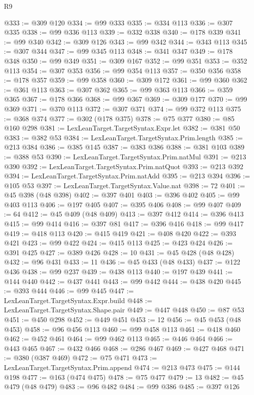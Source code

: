 \begin{lexlean}{R9}
\begin{coremodule}
@333 := @309 @120
@334 := @99 @333
@335 := @334 @113
@336 := @307 @335
@338 := @99 @336 @113
@339 := @332 @338
@340 := @178 @339
@341 := @99 @340
@342 := @309 @126
@343 := @99 @342
@344 := @343 @113
@345 := @307 @344
@347 := @99 @345 @113
@348 := @341 @347
@349 := @178 @348
@350 := @99 @349
@351 := @309 @167
@352 := @99 @351
@353 := @352 @113
@354 := @307 @353
@356 := @99 @354 @113
@357 := @350 @356
@358 := @178 @357
@359 := @99 @358
@360 := @309 @172
@361 := @99 @360
@362 := @361 @113
@363 := @307 @362
@365 := @99 @363 @113
@366 := @359 @365
@367 := @178 @366
@368 := @99 @367
@369 := @309 @177
@370 := @99 @369
@371 := @370 @113
@372 := @307 @371
@374 := @99 @372 @113
@375 := @368 @374
@377 := @302 (@178 @375)
@378 := @75 @377
@380 := @85 @160 @298
@381 := LexLeanTarget.TargetSyntax.Expr.let
@382 := @381 @50
@383 := @382 @53
@384 := LexLeanTarget.TargetSyntax.Prim.length
@385 := @213 @384
@386 := @385 @145
@387 := @383 @386
@388 := @381 @103
@389 := @388 @53
@390 := LexLeanTarget.TargetSyntax.Prim.natMul
@391 := @213 @390
@392 := LexLeanTarget.TargetSyntax.Prim.natQuot
@393 := @213 @392
@394 := LexLeanTarget.TargetSyntax.Prim.natAdd
@395 := @213 @394
@396 := @105 @53
@397 := LexLeanTarget.TargetSyntax.Value.nat
@398 := 72
@401 := @45 @398 (@48 @398)
@402 := @397 @401
@403 := @396 @402
@405 := @99 @403 @113
@406 := @197 @405
@407 := @395 @406
@408 := @99 @407
@409 := 64
@412 := @45 @409 (@48 @409)
@413 := @397 @412
@414 := @396 @413
@415 := @99 @414
@416 := @397 @81
@417 := @396 @416
@418 := @99 @417
@419 := @418 @113
@420 := @415 @419
@421 := @408 @420
@422 := @393 @421
@423 := @99 @422
@424 := @415 @113
@425 := @423 @424
@426 := @391 @425
@427 := @389 @426
@428 := 10
@431 := @45 @428 (@48 @428)
@432 := @96 @431
@433 := 11
@436 := @45 @433 (@48 @433)
@437 := @122 @436
@438 := @99 @237
@439 := @438 @113
@440 := @197 @439
@441 := @144 @440
@442 := @437 @441
@443 := @99 @442
@444 := @438 @420
@445 := @393 @444
@446 := @99 @445
@447 := LexLeanTarget.TargetSyntax.Expr.build
@448 := LexLeanTarget.TargetSyntax.Shape.pair
@449 := @447 @448
@450 := @87 @53
@451 := @450 @298
@452 := @449 @451
@453 := 12
@456 := @45 @453 (@48 @453)
@458 := @96 @456 @113
@460 := @99 @458 @113
@461 := @418 @460
@462 := @452 @461
@464 := @99 @462 @113
@465 := @446 @464
@466 := @443 @465
@467 := @432 @466
@468 := @286 @467
@469 := @427 @468
@471 := @380 (@387 @469)
@472 := @75 @471
@473 := LexLeanTarget.TargetSyntax.Prim.append
@474 := @213 @473
@475 := @144 @198
@477 := @163 (@474 @475)
@478 := @75 @477
@479 := 13
@482 := @45 @479 (@48 @479)
@483 := @96 @482
@484 := @99 @386
@485 := @397 @126

\end{coremodule}
\end{lexlean}
